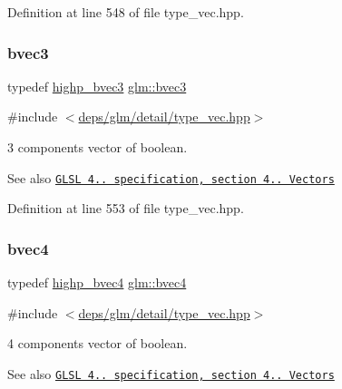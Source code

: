 Definition at line 548 of file type\+\_\+vec.\+hpp.

\mbox{\label{group__core__types_ga3f07d6d37fc6fe875170fd5799685bcf}} 
\subsubsection{\texorpdfstring{bvec3}{bvec3}}
{\footnotesize\ttfamily typedef \hyperlink{group__core__precision_ga0e3365e13160aa93d2a9c68529a013ce}{highp\+\_\+bvec3} \hyperlink{group__core__types_ga3f07d6d37fc6fe875170fd5799685bcf}{glm\+::bvec3}}



{\ttfamily \#include $<$\hyperlink{type__vec_8hpp}{deps/glm/detail/type\+\_\+vec.\+hpp}$>$}

3 components vector of boolean.

\begin{DoxySeeAlso}{See also}
\href{http://www.opengl.org/registry/doc/GLSLangSpec.4.20.8.pdf}{\tt G\+L\+SL 4.. specification, section 4.. Vectors} 
\end{DoxySeeAlso}


Definition at line 553 of file type\+\_\+vec.\+hpp.

\mbox{\label{group__core__types_ga6bb211b3d3bebae3867548d5673ca5cd}} 
\subsubsection{\texorpdfstring{bvec4}{bvec4}}
{\footnotesize\ttfamily typedef \hyperlink{group__core__precision_gaa99e0301060bf06e7750c1c3591b6b4e}{highp\+\_\+bvec4} \hyperlink{group__core__types_ga6bb211b3d3bebae3867548d5673ca5cd}{glm\+::bvec4}}



{\ttfamily \#include $<$\hyperlink{type__vec_8hpp}{deps/glm/detail/type\+\_\+vec.\+hpp}$>$}

4 components vector of boolean.

\begin{DoxySeeAlso}{See also}
\href{http://www.opengl.org/registry/doc/GLSLangSpec.4.20.8.pdf}{\tt G\+L\+SL 4.. specification, section 4.. Vectors} 
\end{DoxySeeAlso}


